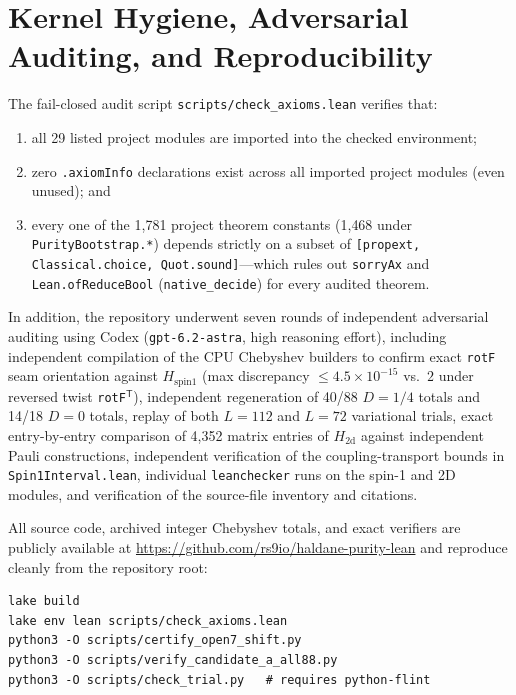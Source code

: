 \documentclass[11pt,a4paper]{article}
\newcommand{\id}[1]{{\small\nolinkurl{#1}}}
\begin{document}
\section{Kernel Hygiene, Adversarial Auditing, and Reproducibility}
The fail-closed audit script \id{scripts/check_axioms.lean} verifies that:
\begin{enumerate}[leftmargin=1.8em,itemsep=2pt]
  \item all 29 listed project modules are imported into the checked environment;
  \item zero \id{.axiomInfo} declarations exist across all imported project modules (even unused); and
  \item every one of the 1{,}781 project theorem constants (1{,}468 under \id{PurityBootstrap.*}) depends strictly on a subset of \id{[propext, Classical.choice, Quot.sound]}---which rules out \id{sorryAx} and \id{Lean.ofReduceBool} (\id{native_decide}) for every audited theorem.
\end{enumerate}
In addition, the repository underwent seven rounds of independent adversarial auditing using Codex (\id{gpt-6.2-astra}, high reasoning effort), including independent compilation of the CPU Chebyshev builders to confirm exact \id{rotF} seam orientation against $H_{\mathrm{spin1}}$ (max discrepancy $\le 4.5 \times 10^{-15}$ vs.\ $2$ under reversed twist \id{rotF}$^\mathsf{T}$), independent regeneration of 40/88 $D=1/4$ totals and 14/18 $D=0$ totals, replay of both $L=112$ and $L=72$ variational trials, exact entry-by-entry comparison of 4{,}352 matrix entries of $H_{\mathrm{2d}}$ against independent Pauli constructions, independent verification of the coupling-transport bounds in \id{Spin1Interval.lean}, individual \id{leanchecker} runs on the spin-1 and 2D modules, and verification of the source-file inventory and citations.

All source code, archived integer Chebyshev totals, and exact verifiers are publicly available at \url{https://github.com/rs9io/haldane-purity-lean} and reproduce cleanly from the repository root:
\begin{verbatim}
lake build
lake env lean scripts/check_axioms.lean
python3 -O scripts/certify_open7_shift.py
python3 -O scripts/verify_candidate_a_all88.py
python3 -O scripts/check_trial.py   # requires python-flint
\end{verbatim}
\end{document}

